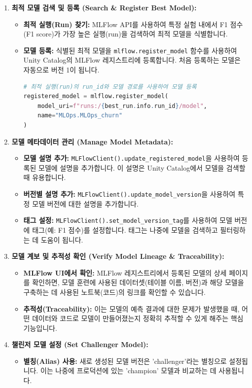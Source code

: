 \documentclass[11pt,a4paper]{article}
\theoremstyle{definition}
\begin{document}
\begin{enumerate}
    \item \textbf{최적 모델 검색 및 등록 (Search & Register Best Model):}
    \begin{itemize}
        \item \textbf{최적 실행(Run) 찾기:} MLFlow API를 사용하여 특정 실험 내에서 F1 점수(F1 score)가 가장 높은 실행(run)을 검색하여 최적 모델을 식별합니다.
        \item \textbf{모델 등록:} 식별된 최적 모델을 \texttt{mlflow.register_model} 함수를 사용하여 Unity Catalog의 MLFlow 레지스트리에 등록합니다. 처음 등록하는 모델은 자동으로 버전 1이 됩니다.
        \begin{lstlisting}[language=Python, caption={MLFlow 모델 등록 예시}, label={lst:mlflow_register_model}]
# 최적 실행(run)의 run_id와 모델 경로를 사용하여 모델 등록
registered_model = mlflow.register_model(
    model_uri=f"runs:/{best_run.info.run_id}/model",
    name="MLOps.MLOps_churn"
)
\end{lstlisting}
    \end{itemize}

    \item \textbf{모델 메타데이터 관리 (Manage Model Metadata):}
    \begin{itemize}
        \item \textbf{모델 설명 추가:} \texttt{MLFlowClient().update_registered_model}을 사용하여 등록된 모델에 설명을 추가합니다. 이 설명은 Unity Catalog에서 모델을 검색할 때 유용합니다.
        \item \textbf{버전별 설명 추가:} \texttt{MLFlowClient().update_model_version}을 사용하여 특정 모델 버전에 대한 설명을 추가합니다.
        \item \textbf{태그 설정:} \texttt{MLFlowClient().set_model_version_tag}를 사용하여 모델 버전에 태그(예: F1 점수)를 설정합니다. 태그는 나중에 모델을 검색하고 필터링하는 데 도움이 됩니다.
    \end{itemize}

    \item \textbf{모델 계보 및 추적성 확인 (Verify Model Lineage & Traceability):}
    \begin{itemize}
        \item \textbf{MLFlow UI에서 확인:} MLFlow 레지스트리에서 등록된 모델의 상세 페이지를 확인하면, 모델 훈련에 사용된 데이터셋(테이블 이름, 버전)과 해당 모델을 구축하는 데 사용된 노트북(코드)의 링크를 확인할 수 있습니다.
        \item \textbf{추적성(Traceability):} 이는 모델의 예측 결과에 대한 문제가 발생했을 때, 어떤 데이터와 코드로 모델이 만들어졌는지 정확히 추적할 수 있게 해주는 핵심 기능입니다.
    \end{itemize}

    \item \textbf{챌린저 모델 설정 (Set Challenger Model):}
    \begin{itemize}
        \item \textbf{별칭(Alias) 사용:} 새로 생성된 모델 버전은 'challenger'라는 별칭으로 설정됩니다. 이는 나중에 프로덕션에 있는 'champion' 모델과 비교하는 데 사용됩니다.
    \end{itemize}
\end{enumerate}
\end{document}
